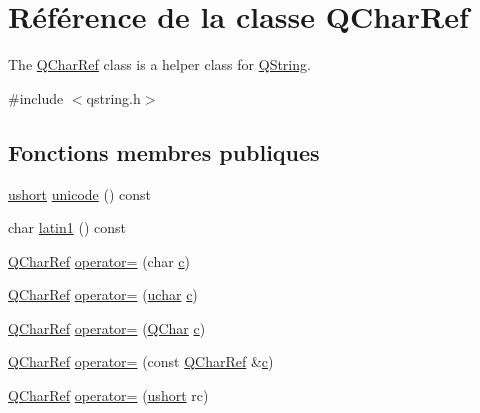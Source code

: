 \hypertarget{class_q_char_ref}{}\section{Référence de la classe Q\+Char\+Ref}
\label{class_q_char_ref}


The \hyperlink{class_q_char_ref}{Q\+Char\+Ref} class is a helper class for \hyperlink{class_q_string}{Q\+String}.  




{\ttfamily \#include $<$qstring.\+h$>$}

\subsection*{Fonctions membres publiques}
\begin{DoxyCompactItemize}
\item 
\hyperlink{qglobal_8h_ab95f123a6c9bcfee6a343170ef8c5f69}{ushort} \hyperlink{class_q_char_ref_a6b143a8b6c0f469f51014fddaf56328b}{unicode} () const 
\item 
char \hyperlink{class_q_char_ref_a7fd8ad2c3d71cdef1a2ec0d90b0ef117}{latin1} () const 
\item 
\hyperlink{class_q_char_ref}{Q\+Char\+Ref} \hyperlink{class_q_char_ref_a47f21f82ee76a7d5812b49f081fd232f}{operator=} (char \hyperlink{060__command__switch_8tcl_ab14f56bc3bd7680490ece4ad7815465f}{c})
\item 
\hyperlink{class_q_char_ref}{Q\+Char\+Ref} \hyperlink{class_q_char_ref_ac65cad91eda1d15edad8de032c847206}{operator=} (\hyperlink{qglobal_8h_a65f85814a8290f9797005d3b28e7e5fc}{uchar} \hyperlink{060__command__switch_8tcl_ab14f56bc3bd7680490ece4ad7815465f}{c})
\item 
\hyperlink{class_q_char_ref}{Q\+Char\+Ref} \hyperlink{class_q_char_ref_a34c39f6b959d3fada9ecb0a3fff3c635}{operator=} (\hyperlink{class_q_char}{Q\+Char} \hyperlink{060__command__switch_8tcl_ab14f56bc3bd7680490ece4ad7815465f}{c})
\item 
\hyperlink{class_q_char_ref}{Q\+Char\+Ref} \hyperlink{class_q_char_ref_a470ab1b2b20425c7d140b78333f9e9d9}{operator=} (const \hyperlink{class_q_char_ref}{Q\+Char\+Ref} \&\hyperlink{060__command__switch_8tcl_ab14f56bc3bd7680490ece4ad7815465f}{c})
\item 
\hyperlink{class_q_char_ref}{Q\+Char\+Ref} \hyperlink{class_q_char_ref_ac3caae81799f20bc57f168b01935964f}{operator=} (\hyperlink{qglobal_8h_ab95f123a6c9bcfee6a343170ef8c5f69}{ushort} rc)
\item 

\end{DoxyCompactItemize}
